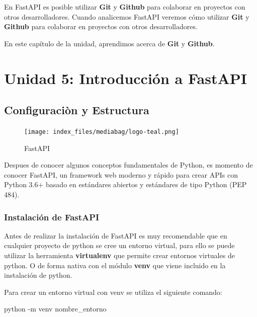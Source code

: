 \documentclass[
  a4paper,
  DIV=11,
  numbers=noendperiod,
  onepage,
  openany]{scrreprt}
\newenvironment{Shaded}{\begin{snugshade}}{\end{snugshade}}
\newcommand{\AttributeTok}[1]{\textcolor[rgb]{0.40,0.45,0.13}{#1}}
\newcommand{\ExtensionTok}[1]{\textcolor[rgb]{0.00,0.23,0.31}{#1}}
\newcommand{\NormalTok}[1]{\textcolor[rgb]{0.00,0.23,0.31}{#1}}
\begin{document}
En FastAPI es posible utilizar \textbf{Git} y \textbf{Github} para
colaborar en proyectos con otros desarrolladores. Cuando analicemos
FastAPI veremos cómo utilizar \textbf{Git} y \textbf{Github} para
colaborar en proyectos con otros desarrolladores.

En este capítulo de la unidad, aprendimos acerca de \textbf{Git} y
\textbf{Github}.

\part{Unidad 5: Introducción a FastAPI}

\chapter{Configuraciòn y
Estructura}\label{configuraciuxf2n-y-estructura}

\begin{figure}[H]

{\centering \texttt{[image: index\_files/mediabag/logo-teal.png]}

}

\caption{FastAPI}

\end{figure}%

Despues de conocer algunos conceptos fundamentales de Python, es momento
de conocer FastAPI, un framework web moderno y rápido para crear APIs
con Python 3.6+ basado en estándares abiertos y estándares de tipo
Python (PEP 484).

\section{Instalación de FastAPI}\label{instalaciuxf3n-de-fastapi}

Antes de realizar la instalación de FastAPI es muy recomendable que en
cualquier proyecto de python se cree un entorno virtual, para ello se
puede utilizar la herramienta \textbf{virtualenv} que permite crear
entornos virtuales de python. O de forma nativa con el módulo
\textbf{venv} que viene incluido en la instalación de python.

Para crear un entorno virtual con venv se utiliza el siguiente comando:

\begin{Shaded}
\begin{Highlighting}[]
\ExtensionTok{python} \AttributeTok{{-}m}\NormalTok{ venv nombre\_entorno}
\end{Highlighting}
\end{Shaded}
\end{document}
